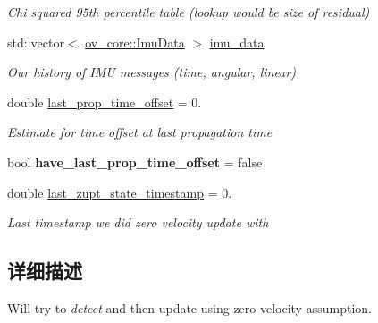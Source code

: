 \begin{DoxyCompactItemize}
\begin{DoxyCompactList}\small\item\em Chi squared 95th percentile table (lookup would be size of residual) \end{DoxyCompactList}\item 
\mbox{\label{classov__msckf_1_1UpdaterZeroVelocity_a38119874bfd080afe2f21444e7f26692}} 
std\+::vector$<$ \hyperlink{structov__core_1_1ImuData}{ov\+\_\+core\+::\+Imu\+Data} $>$ \hyperlink{classov__msckf_1_1UpdaterZeroVelocity_a38119874bfd080afe2f21444e7f26692}{imu\+\_\+data}
\begin{DoxyCompactList}\small\item\em Our history of I\+MU messages (time, angular, linear) \end{DoxyCompactList}\item 
\mbox{\label{classov__msckf_1_1UpdaterZeroVelocity_ae3d40558eff57d631724a15ab431f83a}} 
double \hyperlink{classov__msckf_1_1UpdaterZeroVelocity_ae3d40558eff57d631724a15ab431f83a}{last\+\_\+prop\+\_\+time\+\_\+offset} = 0.
\begin{DoxyCompactList}\small\item\em Estimate for time offset at last propagation time \end{DoxyCompactList}\item 
\mbox{\label{classov__msckf_1_1UpdaterZeroVelocity_acf1718826a68f0bae6fe0bbd7d2654de}} 
bool {\bfseries have\+\_\+last\+\_\+prop\+\_\+time\+\_\+offset} = false
\item 
\mbox{\label{classov__msckf_1_1UpdaterZeroVelocity_a6b782fc825eddcd71a7808288cbb9734}} 
double \hyperlink{classov__msckf_1_1UpdaterZeroVelocity_a6b782fc825eddcd71a7808288cbb9734}{last\+\_\+zupt\+\_\+state\+\_\+timestamp} = 0.
\begin{DoxyCompactList}\small\item\em Last timestamp we did zero velocity update with \end{DoxyCompactList}\end{DoxyCompactItemize}


\subsection{详细描述}
Will try to {\itshape detect} and then update using zero velocity assumption. 

